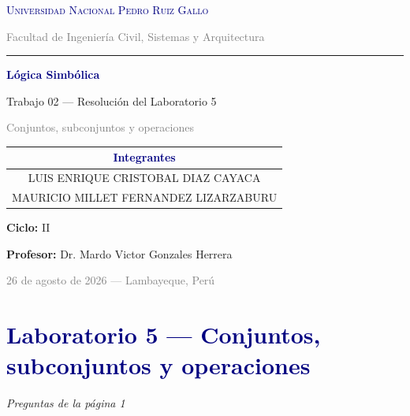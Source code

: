 \documentclass[12pt,a4paper]{article}
\newcommand{\propbox}[1]{\noindent\textcolor{muted}{\small\textit{#1}}\par}
\begin{document}
\begin{titlepage}
  \centering
  \vspace*{0.4cm}
  {\large\scshape\textcolor{navy}{Universidad Nacional Pedro Ruiz Gallo}\par}
  \vspace{0.15cm}
  {\small\textcolor{gray}{Facultad de Ingeniería Civil, Sistemas y Arquitectura}\par}
  \vspace{0.35cm}
  {\color{navy}\rule{\linewidth}{1.2pt}\par}
  \vspace{0.9cm}
  {\Huge\textbf{\textcolor{navy}{Lógica Simbólica}}\par}
  \vspace{0.35cm}
  {\Large\textcolor{accent}{Trabajo 02 — Resolución del Laboratorio 5}\par}
  \vspace{0.2cm}
  {\large\textcolor{gray}{Conjuntos, subconjuntos y operaciones}\par}
  \vspace{1.1cm}
  \begin{center}
    \begin{tabular}{c}
      \toprule
      \small\textcolor{navy}{\textbf{Integrantes}} \\ \midrule
      \small LUIS ENRIQUE CRISTOBAL DIAZ CAYACA \\
      \small MAURICIO MILLET FERNANDEZ LIZARZABURU \\
      \bottomrule
    \end{tabular}
  \end{center}
  \vspace{0.7cm}
  {\small\textbf{Ciclo:} II\par}
  \vspace{0.15cm}
  {\small\textbf{Profesor:} Dr. Mardo Victor Gonzales Herrera\par}
  \vspace{1.6cm}
  {\small\textcolor{gray}{26 de agosto de 2026 — Lambayeque, Perú}\par}
  \vfill
\end{titlepage}

\section*{\textcolor{navy}{Laboratorio 5 — Conjuntos, subconjuntos y operaciones}}
\propbox{Preguntas de la página 1}
\end{document}

